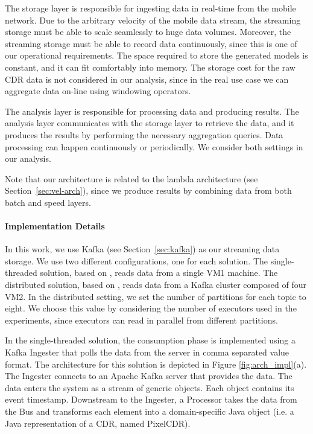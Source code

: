 {The storage layer is responsible for ingesting data in real-time from the mobile network. Due to the arbitrary velocity of the mobile data stream, the streaming storage must be able to scale seamlessly to huge data volumes. Moreover, the streaming storage must be able to record data continuously, since this is one of our operational requirements. The space required to store the generated models is constant, and it can fit comfortably into memory. The storage cost for the raw CDR data is not considered in our analysis, since in the real use case we can aggregate data on-line using windowing operators.

The analysis layer is responsible for processing data and producing results. The analysis layer communicates with the storage layer to retrieve the data, and it produces the results by performing the necessary aggregation queries. Data processing can happen continuously or periodically. We consider both settings in our analysis.

Note that our architecture is related to the lambda architecture (see Section~\ref{sec:vel-arch}), since we produce results by combining data from both batch and speed layers.

\paragraph{Implementation Details}
In this work, we use Kafka (see Section~\ref{sec:kafka}) as our streaming data storage. We use two different configurations, one for each solution. The single-threaded solution, based on \sti{}, reads data from a single VM1 machine. The distributed solution, based on \sparkdi{}, reads data from a Kafka cluster composed of four VM2. In the distributed setting, we set the number of partitions for each topic to eight. We choose this value by considering the number of executors used in the experiments, since executors can read in parallel from different partitions.

In the single-threaded solution, the consumption phase is implemented using a Kafka Ingester that polls the data from the server in comma separated value format. The architecture for this solution is depicted in Figure \ref{fig:arch_impl}(a). The Ingester connects to an Apache Kafka server that provides the data. The data enters the system as a stream of generic objects. Each object contains its event timestamp. Downstream to the Ingester, a Processor takes the data from the Bus and transforms each element into a domain-specific Java object (i.e. a Java representation of a CDR, named PixelCDR).

}
